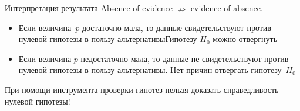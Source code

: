 \documentclass[11pt,pdf,utf8,hyperref={unicode},aspectratio=169]{beamer}
\begin{document}
\begin{frame}{Интерпретация результата Absence of evidence $\nRightarrow$ evidence of absence.}
%
    \begin{itemize}
	\item Если величина~$p$ достаточно мала, то данные свидетельствуют против нулевой гипотезы в пользу альтернативы\hfill \alert{Гипотезу $H_0$ можно отвергнуть}

	\item Если величина $p$ недостаточно мала, то данные не свидетельствуют против нулевой гипотезы в пользу альтернативы. \hfill \alert{Нет причин отвергать гипотезу~$H_0$}
    \end{itemize}
	\bigskip

    \centering
	При помощи инструмента проверки гипотез нельзя доказать справедливость нулевой гипотезы!


\end{frame}
\end{document}
